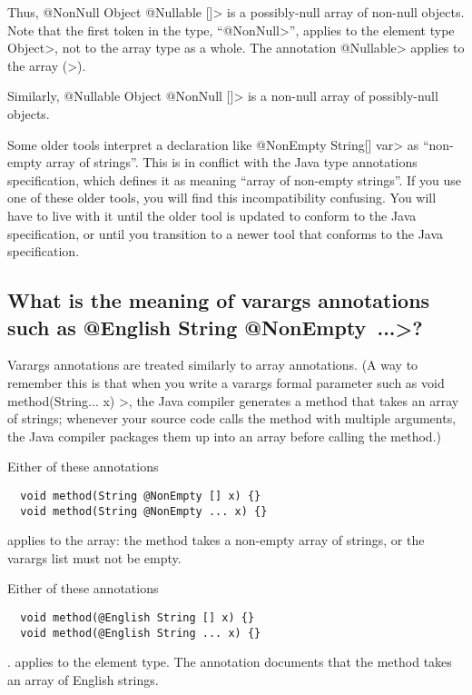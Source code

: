 Thus,
\<@NonNull Object @Nullable []> is a possibly-null array of non-null
objects.  Note that the first token in the type,
``\<@NonNull>'', applies to the element
type \<Object>, not to the array type as a whole.  The annotation \<@Nullable> applies to the
array (\<[]>).

Similarly,
\<@Nullable Object @NonNull []> is a non-null array of possibly-null
objects.


Some older tools interpret a declaration like \<@NonEmpty String[] var> as
``non-empty array of strings''.  This is in conflict with the Java type
annotations specification, which defines it as meaning ``array of
non-empty strings''.
If you use one of these
older tools, you will find this incompatibility confusing.
You will have to live with it until the older
tool is updated to conform to the Java specification, or until you
transition to a newer tool that conforms to the Java specification.


\subsection{What is the meaning of varargs annotations such as \<@English String @NonEmpty~...>?\label{faq-varargs-syntax-meaning}}

Varargs annotations are treated similarly to array annotations.
(A way to remember this is that 
when you write a varargs formal parameter such as
\<void method(String... x) \ttlcb\ttrcb>, the Java compiler generates a
method that takes an array of strings; whenever your source code calls the
method with multiple arguments, the Java compiler packages them up into an
array before calling the method.)

Either of these annotations

\begin{Verbatim}
  void method(String @NonEmpty [] x) {}
  void method(String @NonEmpty ... x) {}
\end{Verbatim}

\noindent
applies to the array:  the method takes a non-empty array of strings, or
the varargs list must not be empty.

Either of these annotations

\begin{Verbatim}
  void method(@English String [] x) {}
  void method(@English String ... x) {}
\end{Verbatim}

\noindent.
applies to the element type. The annotation documents that the method takes an array of English strings.


